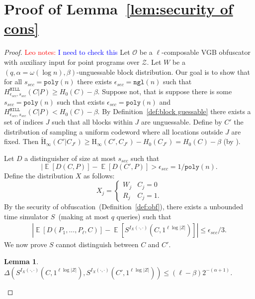 \documentclass[11pt]{article}
\newcommand{\defref}[1]{\mbox{Definition~\ref{#1}}}
\newcommand{\lemref}[1]{\mbox{Lemma~\ref{#1}}}
\DeclareMathOperator*{\expe}{\mathbb{E}}
\newcommand{\hill}{\ensuremath{\mathtt{HILL}}\xspace}
\newcommand{\poly}{\ensuremath{\mathtt{poly}}\xspace}
\newcommand{\ngl}{\ensuremath{\mathtt{ngl}}\xspace}
\newcommand{\Hoo}{\mathrm{H}_\infty}
\newcommand{\Hav}{\tilde{\mathrm{H}}_\infty}
\newtheorem{lemma}[theorem]{Lemma}
\newcommand{\authnote}[2]{{\textcolor{red}{\textsf{#1 notes: }\textcolor{blue}{ #2}}\marginpar{\textcolor{red}{\textbf{!!!!!}}}}}
\newcommand{\authnote}[2]{}
\newcommand{\lnote}[1]{{\authnote{Leo}{#1}}}
\begin{document}
\section{Proof of \lemref{lem:security of cons}}
\label{app:security of main cons}
\begin{proof}
\lnote{I need to check this}
Let $\mathcal{O}$ be a $\ell$-composable VGB obfuscator with auxiliary input for point programs over $\mathcal{Z}$.  Let $W$ be a $(q, \alpha = \omega(\log n), \beta)$-unguessable block distribution.  Our goal is to show that for all $s_{sec} = \poly(n)$ there exists $\epsilon_{sec} =\ngl(n)$ such that $H^{\hill}_{\epsilon_{sec}, s_{sec}}(C|P)\geq H_0(C)- \beta$. %
Suppose not, that is suppose there is some $s_{sec} = \poly(n)$ such that exists $\epsilon_{sec} = \poly(n)$ and $H^{\hill}_{\epsilon_{sec}, s_{sec}}(C|P) < H_0(C)-\beta$.
By \defref{def:block guessable} there exists a set of indices $J$ such that all blocks within $J$ are unguessable.  Define by $C'$ the distribution of sampling a uniform codeword where all locations outside $J$ are fixed.  Then
$\Hav(C' | C_{J^c}) \ge \Hoo(C', C_{J^c}) - H_0(C_{J^c})  = H_0(C) - \beta$ (by \cite[Lemma 2.2b]{DBLP:journals/siamcomp/DodisORS08}).

Let $D$ a distinguisher of size at most $s_{sec}$ such that
\[
| \expe[D(C, P)] - \expe[D(C', P)] > \epsilon_{sec} = 1/\poly(n).
\]
Define the distribution $X$ as follows:
\[X_j =
\begin{cases}
W_j & C_j = 0\\
R_j & C_j = 1.
\end{cases}\]  By the security of obfuscation~(\defref{def:obf}), there exists a unbounded time simulator $S$~(making at most $q$ queries) such that
\begin{align}
\label{eq:dist before}
|\expe [D(P_1,..., P_\ell, C)] - \expe [S^{I_X(\cdot, \cdot)}(C, 1^{\ell \log |Z|})] |\leq \epsilon_{sec}/3.
\end{align}
We now prove $S$ cannot distinguish between $C$ and $C'$.
\begin{lemma}
\label{lem:sim cannot distinguish}
$\Delta(S^{I_X(\cdot, \cdot)}(C, 1^{\ell \log |Z|}), S^{I_X(\cdot, \cdot)}(C', 1^{\ell \log |Z|})) \le (\ell-\beta) 2^{-(\alpha+1)}$.
\end{lemma}


\end{proof}
\end{document}
